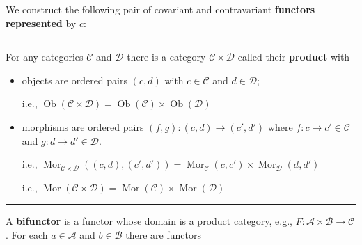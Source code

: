 \documentclass[12pt]{article}
\newcommand{\keyword}[1]{\textbf{#1}}
\newcommand{\sepline}{\rule{\textwidth}{0.4pt}}
\theoremstyle{definition}
\renewcommand{\AA}{\mathcal{A}}
\newcommand{\BB}{\mathcal{B}}
\newcommand{\CC}{\mathcal{C}}
\newcommand{\DD}{\mathcal{D}}
\newcommand{\<}{\left\langle}
\renewcommand{\>}{\right\rangle}
\newcommand{\Mapsto}{\longmapsto}
\DeclareMathOperator{\Ob}{Ob}
\DeclareMathOperator{\Mor}{Mor}
\begin{document}
We construct the following pair of covariant and contravariant \keyword{functors represented} by $c$:
\begin{center}
    \hspace{2cm}
\end{center}


\sepline

For any categories $\CC$ and $\DD$ there is a category $\CC \times \DD$ called their \keyword{product} with
\begin{itemize}
    \item objects are ordered pairs $(c, d)$ with $c \in \CC$ and $d \in \DD$;
    
    i.e., $\Ob(\CC \times \DD) = \Ob(\CC) \times \Ob(\DD)$
    \item morphisms are ordered pairs $(f, g) : (c, d) \to (c', d')$ where $f : c \to c' \in \CC$ and $g : d \to d' \in \DD$.
    
    i.e., $\Mor_{\CC \times \DD}((c, d), (c', d')) = \Mor_{\CC}(c, c') \times \Mor_{\DD}(d, d')$

    i.e., $\Mor(\CC \times \DD) = \Mor(\CC) \times \Mor(\DD)$
\end{itemize}

\sepline

A \keyword{bifunctor} is a functor whose domain is a product category, e.g., $F : \AA \times \BB \to \CC$.
For each $a \in \AA$ and $b \in \BB$ there are functors
\begin{center}
    \hspace{2cm}
\end{center}
\end{document}
